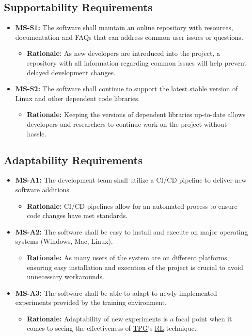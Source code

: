 \documentclass[12pt]{article}
\newcommand{\lips}{\textit{Insert your content here.}}
\begin{document}
\subsection{Supportability Requirements}
\begin{itemize}
  \item \textbf{MS-S1:} The software shall maintain an online repository with resources, documentation and FAQs that can address common user issues or questions.
  \begin{itemize}
    \item \textbf{Rationale:} As new developers are introduced into the project, a repository with all information regarding common issues will help prevent delayed development changes.
  \end{itemize}
  \item \textbf{MS-S2:} The software shall continue to support the latest stable version of Linux and other dependent code libraries.
  \begin{itemize}
    \item \textbf{Rationale:} Keeping the versions of dependent libraries up-to-date allows developers and researchers to continue work on the project without hassle.
  \end{itemize}
\end{itemize}
\subsection{Adaptability Requirements}
\begin{itemize}
  \item \textbf{MS-A1:} The development team shall utilize a CI/CD pipeline to deliver new software additions.
  \begin{itemize}
    \item \textbf{Rationale:} CI/CD pipelines allow for an automated process to ensure code changes have met standards. 
  \end{itemize}
  \item \textbf{MS-A2:} The software shall be easy to install and execute on major operating systems (Windows, Mac, Linux).

  \begin{itemize}
    \item \textbf{Rationale:} As many users of the system are on different platforms, ensuring easy installation and execution of the project is crucial to avoid unnecessary workarounds.
  \end{itemize}
  \item \textbf{MS-A3:} The software shall be able to adapt to newly implemented experiments provided by the training environment.
  \begin{itemize}
    \item \textbf{Rationale:} Adaptability of new experiments is a focal point when it comes to seeing the effectiveness of \hyperref[def:tpg]{TPG}’s \hyperref[def:rl]{RL} technique.
  \end{itemize}
\end{itemize}
\end{document}
